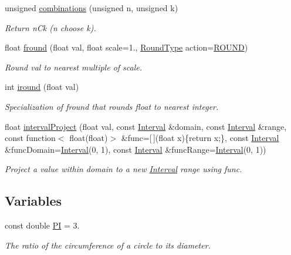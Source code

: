 \begin{DoxyCompactItemize}
unsigned \hyperlink{namespacekmath_a53519d2ec30d9df038dbe8ceaead1a9c}{combinations} (unsigned n, unsigned k)
\begin{DoxyCompactList}\small\item\em Return {\ttfamily n}C{\ttfamily k} (n choose k). \end{DoxyCompactList}\item 
float \hyperlink{namespacekmath_aa18b5fc52315b0ca7717a52bdf152ee6}{fround} (float val, float scale=1., \hyperlink{namespacekmath_a1e00ae34fe8ed9548870fc759ea82609}{Round\-Type} action=\hyperlink{namespacekmath_a1e00ae34fe8ed9548870fc759ea82609ae04658d947a7879a4502f837c286f1ac}{R\-O\-U\-N\-D})
\begin{DoxyCompactList}\small\item\em Round val to nearest multiple of scale. \end{DoxyCompactList}\item 
int \hyperlink{namespacekmath_a32d7d4c091092ac7e21d7beb15daaf1a}{iround} (float val)
\begin{DoxyCompactList}\small\item\em Specialization of {\ttfamily fround} that rounds float to nearest integer. \end{DoxyCompactList}\item 
float \hyperlink{namespacekmath_af21fdb579807bd7054875a2369e15941}{interval\-Project} (float val, const \hyperlink{structkmath_1_1_interval}{Interval} \&domain, const \hyperlink{structkmath_1_1_interval}{Interval} \&range, const function$<$ float(float)$>$ \&func=\mbox{[}$\,$\mbox{]}(float x)\{return x;\}, const \hyperlink{structkmath_1_1_interval}{Interval} \&func\-Domain=\hyperlink{structkmath_1_1_interval}{Interval}(0, 1), const \hyperlink{structkmath_1_1_interval}{Interval} \&func\-Range=\hyperlink{structkmath_1_1_interval}{Interval}(0, 1))
\begin{DoxyCompactList}\small\item\em Project a value within {\ttfamily domain} to a new \hyperlink{structkmath_1_1_interval}{Interval} {\ttfamily range} using {\ttfamily func}. \end{DoxyCompactList}\end{DoxyCompactItemize}
\subsection*{Variables}
\begin{DoxyCompactItemize}
\item 
const double \hyperlink{namespacekmath_a1224c45abb03af2a5136e24f09d9b4c3}{P\-I} = 3.
\begin{DoxyCompactList}\small\item\em The ratio of the circumference of a circle to its diameter. \end{DoxyCompactList}\end{DoxyCompactItemize}


